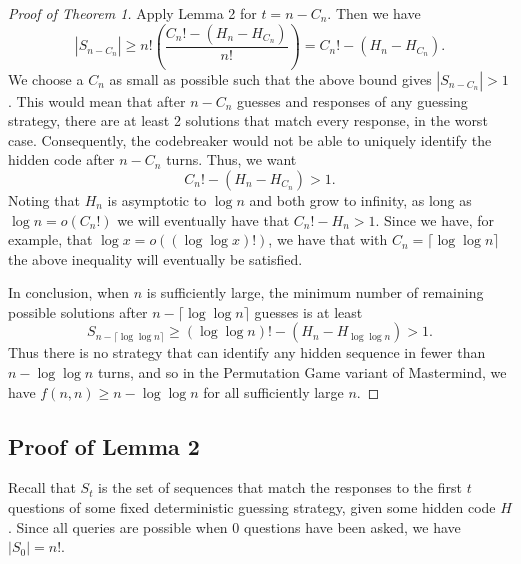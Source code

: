 \documentclass[12pt, a4paper]{article}
\begin{document}
		 \begin{proof}[Proof of Theorem 1]
		 Apply Lemma 2 for $t = n-C_n$. Then we have
		 \begin{equation*}
		 |S_{n-C_{n}}|  \ge n!\left(\frac{C_{n}! - (H_n - H_{C_{n}})}{n!}\right)
		 = C_{n}! - (H_n-H_{C_{n}}).
		 \end{equation*}
		 We choose a $C_{n}$ as small as possible such that the above bound gives $|S_{n-C_n}| > 1$. This would mean that after $n-C_n$ guesses and responses of any guessing strategy, there are at least 2 solutions that match every response, in the worst case. Consequently, the codebreaker would not be able to uniquely identify the hidden code after $n-C_n$ turns. Thus, we want
		 \begin{equation*}
		 C_{n}! - (H_n - H_{C_{n}}) > 1.
		 \end{equation*}
		 Noting that $H_n$ is asymptotic to $\log n$ and both grow to infinity, as long as $\log n = o(C_n!)$ we will eventually have that $C_n!-H_n > 1$. Since we have, for example, that $\log x = o((\log \log x)!)$, we have that with $C_n = \lceil \log \log n \rceil$ the above inequality will eventually be satisfied.
		 
		 In conclusion, when $n$ is sufficiently large, the minimum number of remaining
		 possible solutions after $n - \lceil \log\log n \rceil$ guesses is at least
		 \begin{equation*}
		 S_{n - \lceil \log\log n \rceil} 
		 \ge (\log\log n)! - (H_n - H_{\log\log n})
		 > 1.
		 \end{equation*}
		 Thus there is no strategy that can identify any hidden sequence in fewer than $n-\log\log n$ turns, and so in the Permutation Game variant of Mastermind, we have $f(n, n)\ge n - \log\log n$ for all sufficiently large $n$.
		\end{proof}
		 
		 
		 \subsection{Proof of Lemma 2}
		 
		 Recall that $S_t$ is the set of sequences that match the responses to the first $t$ questions of some fixed deterministic guessing strategy, given some hidden code $H$. Since all queries are possible when 0 questions have been asked, we have $|S_0| = n!$.
		 
\end{document}
